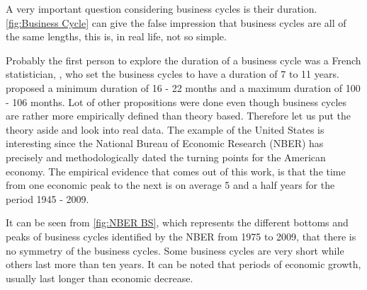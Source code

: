 \documentclass[12pt,a4paper,oneside]{book}
\begin{document}
A very important question considering business cycles is their duration.
\autoref{fig:Business Cycle} can give the false impression that business cycles are all of the same lengths, this is, in real life, not so simple.

Probably the first person to explore the duration of a business cycle was a French statistician, \cite{juglar_crises_1862}, who set the business cycles to have a duration of 7 to 11 years.
\cite{mitchell_measuring_1946} proposed a minimum duration of 16 - 22 months and a maximum duration of 100 - 106 months.
Lot of other propositions were done even though business cycles are rather more empirically defined than theory based.
Therefore let us put the theory aside and look into real data.
The example of the United States is interesting since the National Bureau of Economic Research (NBER) has precisely and methodologically dated the turning points for the American economy. The empirical evidence that comes out of this work, is that the time from one economic peak to the next is on average 5 and a half years for the period 1945 - 2009.

It can be seen from \autoref{fig:NBER BS}, which represents the different bottoms and peaks of business cycles identified by the NBER from 1975 to 2009, that there is no symmetry of the business cycles. Some business cycles are very short while others last more than ten years.
It can be noted that periods of economic growth, usually last longer than economic decrease.
\end{document}
